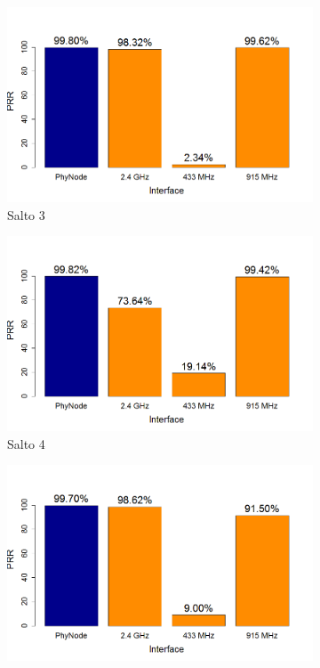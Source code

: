 \documentclass[
	12pt,				%
	openright,			%
	oneside,
	a4paper,			%
	english,			%
	french,				%
	spanish,			%
	brazil				%
	]{abntex2}
\begin{document}
\begin{figure}[htb]
\begin{subfigure}{.5\textwidth}
		\centering
		\includegraphics[width=.98\linewidth]{PRR_Salto3}
		\captionsetup{width=.9\textwidth}
		\caption{Salto 3}
		\label{prr_no_opt_s3}
	\end{subfigure}%
	\begin{subfigure}{.5\textwidth}
		\centering
		\includegraphics[width=.98\linewidth]{PRR_Salto4}
		\captionsetup{width=.9\textwidth}
		\caption{Salto 4}
		\label{prr_no_opt_s4}
	\end{subfigure}
	\begin{subfigure}{.5\textwidth}
		\centering
		\includegraphics[width=.98\linewidth]{PRR_Salto5}

\end{subfigure}
\end{figure}
\end{document}
